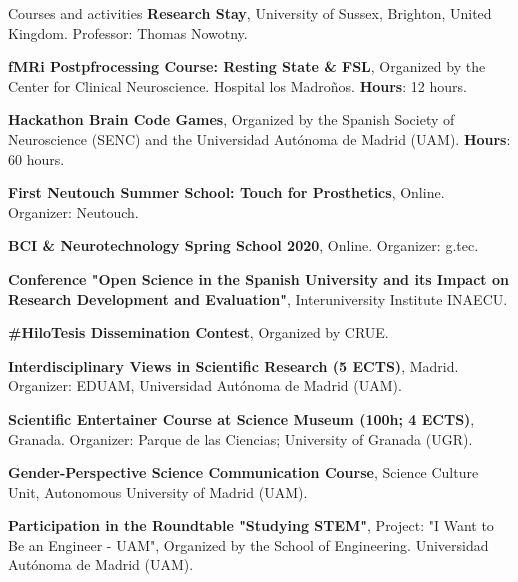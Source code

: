\begin{rubric}{Courses and activities}
 \textbf{Research Stay}, University of Sussex, Brighton, United Kingdom. Professor: Thomas Nowotny.


\entry*[February 2024] \textbf{fMRi Postpfrocessing Course: Resting State \& FSL}, Organized by the Center for Clinical Neuroscience. Hospital los Madroños. \textbf{Hours}: 12 hours.

\entry*[October 2021] \textbf{Hackathon Brain Code Games}, Organized by the Spanish Society of Neuroscience (SENC) and the Universidad Autónoma de Madrid (UAM). \textbf{Hours}: 60 hours.

\entry*[October 2020] \textbf{First Neutouch Summer School: Touch for Prosthetics}, Online. Organizer: Neutouch.

\entry*[April 2020] \textbf{BCI \& Neurotechnology Spring School 2020}, Online. Organizer: g.tec.






\entry*[January 25, 2023] \textbf{Conference "Open Science in the Spanish University and its Impact on Research Development and Evaluation"}, Interuniversity Institute INAECU.

\entry*[May 2021] \textbf{\#HiloTesis Dissemination Contest}, Organized by CRUE.

 \textbf{Interdisciplinary Views in Scientific Research (5 ECTS)}, Madrid. Organizer: EDUAM, Universidad Autónoma de Madrid (UAM).

 \textbf{Scientific Entertainer Course at Science Museum (100h; 4 ECTS)}, Granada. Organizer: Parque de las Ciencias; University of Granada (UGR).

\entry*[February 2024] \textbf{Gender-Perspective Science Communication Course}, Science Culture Unit, Autonomous University of Madrid (UAM).

\entry*[June 2022] \textbf{Participation in the Roundtable "Studying STEM"}, Project: "I Want to Be an Engineer - UAM", Organized by the School of Engineering. Universidad Autónoma de Madrid (UAM).


\end{rubric}
